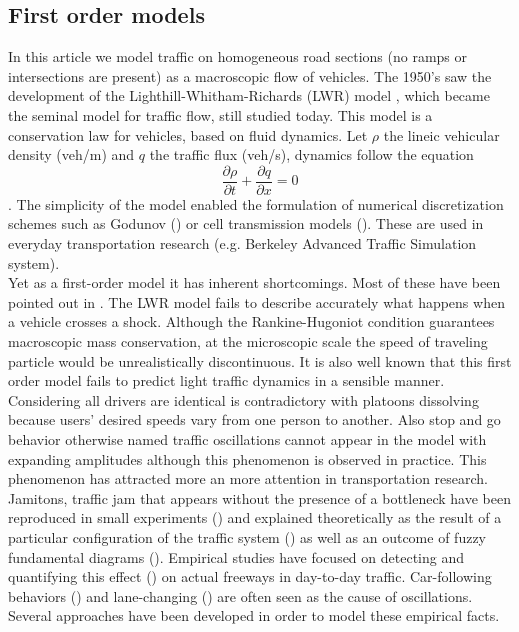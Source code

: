 \documentclass[preprint]{elsarticle}
\begin{document}
\subsection{First order models}
In this article we model traffic on homogeneous road
sections (no ramps or intersections are present) as a macroscopic flow of vehicles. The 1950\textquoteright s saw the development of the Lighthill-Whitham-Richards
(LWR) model \cite{LW,Richards}, which became the seminal model for
traffic flow, still studied today. This model is a conservation law
for vehicles, based on fluid dynamics. Let $\rho$ the lineic vehicular
density (veh/m) and $q$ the traffic flux (veh/s), dynamics follow
the equation
\begin{equation}
\frac{\partial\rho}{\partial t}+\frac{\partial q}{\partial x}=0
\end{equation}.
The simplicity of the model enabled the formulation of numerical discretization
schemes such as Godunov (\cite{godunov,Osher}) or cell transmission
models (\cite{daganzo1994cell,daganzo1995cell}). These are used in
everyday transportation research (e.g. Berkeley Advanced Traffic
Simulation system).\\
Yet as a first-order model it has inherent shortcomings. Most of these
have been pointed out in \cite{Dag_requiem}. The LWR model fails
to describe accurately what happens when a vehicle crosses a shock.
Although the Rankine-Hugoniot condition guarantees macroscopic mass
conservation, at the microscopic scale the speed of traveling particle
would be unrealistically discontinuous. It is also well known that this first order
model fails to predict light traffic dynamics in a sensible manner. Considering
all drivers are identical is contradictory with platoons dissolving because
users' desired speeds vary from one person to another. Also stop and go
behavior otherwise named traffic oscillations cannot appear in the
model with expanding amplitudes although this phenomenon is observed
in practice. This phenomenon has attracted more an more attention
in transportation research. Jamitons, traffic jam that appears without
the presence of a bottleneck have been reproduced in small experiments
(\cite{Jamitons2008,Flynn08onjamitons}) and explained theoretically
as the result of a particular configuration of the traffic system
(\cite{Flynn09self-sustainednonlinear}) as well as an outcome of
fuzzy fundamental diagrams (\cite{Jamitons-multi-valued-fund}). Empirical
studies have focused on detecting and quantifying this effect (\cite{zielke2008empirical})
on actual freeways in day-to-day traffic. Car-following behaviors
(\cite{Mauch02freewaytraffic}) and lane-changing (\cite{lanechangin2005,lanechanging2007})
are often seen as the cause of oscillations. Several approaches have
been developed in order to model these empirical facts.
\end{document}

